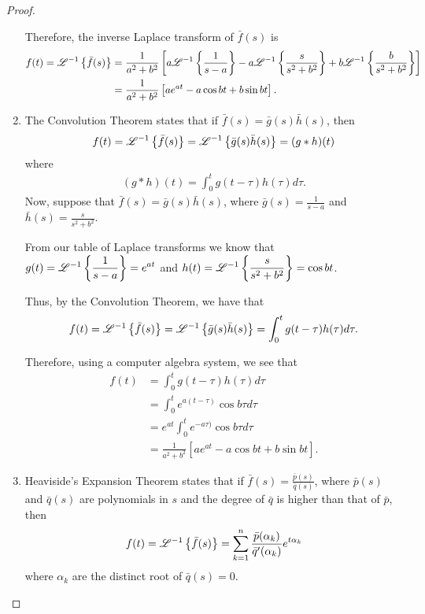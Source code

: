 \begin{proof}
\begin{enumerate}
      Therefore, the inverse Laplace transform of $\bar{f}(s)$ is
      \begin{align*}
        f(t) = \mathscr{L}^{-1}\left\{ {\bar{f}(s)} \right\} &= \frac{1}{a^2+b^2}\left[a\mathscr{L}^{-1}\left\{ {\frac{1}{s-a}} \right\} - a\mathscr{L}^{-1}\left\{ {\frac{s}{s^2+b^2}} \right\} + b\mathscr{L}^{-1}\left\{ {\frac{b}{s^2+b^2}} \right\}\right] \\
        &= \frac{1}{a^2+b^2}\left[ae^{at} - a \cos bt + b \sin bt\right].
      \end{align*}
    \item
      The Convolution Theorem states that if $\bar{f}(s) = \bar{g}(s)\bar{h}(s)$, then
      \begin{align*}
        f(t) = \mathscr{L}^{-1}\left\{ {\bar{f}(s)} \right\} = \mathscr{L}^{-1}\left\{ {\bar{g}(s)\bar{h}(s)} \right\} = (g \ast h)(t)
      \end{align*}
      where
      \begin{align*}
        (g \ast h)(t) = \int_0^t g(t - \tau)h(\tau) d\tau.
      \end{align*}
      Now, suppose that $\bar{f}(s) = \bar{g}(s)\bar{h}(s)$, where
      $\displaystyle \bar{g}(s) = \frac{1}{s-a}$ and
      $\displaystyle \bar{h}(s) = \frac{s}{s^2+b^2}$.

      From our table of Laplace transforms we know that
      $\displaystyle g(t) = \mathscr{L}^{-1}\left\{ {\frac{1}{s-a}} \right\} = e^{at}$ and
      $\displaystyle h(t) = \mathscr{L}^{-1}\left\{ {\frac{s}{s^2+b^2}} \right\} = \cos b t$.

      Thus, by the Convolution Theorem, we have that
      \begin{align*}
        f(t) = \mathscr{L}^{-1}\left\{ {\bar{f}(s)} \right\} = \mathscr{L}^{-1}\left\{ {\bar{g}(s)\bar{h}(s)} \right\} = \int_0^t g(t-\tau) h(\tau) d\tau.
      \end{align*}

      Therefore, using a computer algebra system, we see that
      \begin{align*}
        f(t) &= \int_0^t g(t-\tau) h(\tau) d\tau \\
        &= \int_0^t e^{a(t-\tau)} \cos b\tau d\tau \\
        &= e^{at}\int_0^t e^{-a\tau)} \cos b\tau d\tau \\
        &= \frac{1}{a^2+b^2}\left[ae^{at}-a\cos bt + b\sin bt\right].
      \end{align*}

    \item Heaviside's Expansion Theorem states that
      if $\displaystyle \bar{f}(s) = \frac{\bar{p}(s)}{\bar{q}(s)}$, where $\bar{p}(s)$ and $\bar{q}(s)$ are
      polynomials in $s$ and the degree of $\bar{q}$ is higher than that of $\bar{p}$, then
      \begin{align*}
        f(t) = \mathscr{L}^{-1}\left\{ {\bar{f}(s)} \right\} = \sum_{k=1}^n \frac{\bar{p}(\alpha_k)}{\bar{q}'(\alpha_k)}e^{t\alpha_k}
      \end{align*}
      where $\alpha_k$ are the distinct root of $\bar{q}(s) = 0$.


\end{enumerate}
\end{proof}
